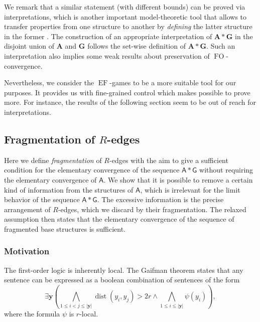 \documentclass[11pt]{article}
\theoremstyle{plain}
\theoremstyle{definition}
\theoremstyle{remark}
\newcommand{\bigland}{\bigwedge}
\DeclareMathOperator\dist{dist}
\DeclareMathOperator\FO{FO}
\DeclareMathOperator{\EF}{EF}
\newcommand{\str}[1]{\mathbf{#1}}
\newcommand{\strseq}[1]{{\boldsymbol{\mathsf{#1}}}}
\newcommand{\tpl}[1]{{\bm{#1}}}
\begin{document}
We remark that a similar statement (with different bounds) can be proved via interpretations, which is another important model-theoretic tool that allows to transfer properties from one structure to another by \emph{defining} the latter structure in the former \cite{hodges}\cite{unified_approach}.
The construction of an appropriate interpretation of $\str{A} * \str{G}$ in the disjoint union of $\str{A}$ and $\str{G}$ follows the set-wise definition of $\str{A} * \str{G}$.
Such an interpretation also implies some weak results about preservation of $\FO$-convergence.

Nevertheless, we consider the $\EF$-games to be a more suitable tool for our purposes.
It provides us with fine-grained control which makes possible to prove more.
For instance, the results of the following section seem to be out of reach for interpretations.

\subsection[Fragmentation of R-edges]{Fragmentation of $R$-edges}\label{ssec:fragmentation}

Here we define \emph{fragmentation} of $R$-edges with the aim to give a sufficient condition for the elementary convergence of the sequence $\strseq{A} * \strseq{G}$ without requiring the elementary convergence of $\strseq{A}$.
We show that it is possible to remove a certain kind of information from the structures of $\strseq{A}$, which is irrelevant for the limit behavior of the sequence $\strseq{A} * \strseq{G}$.
The excessive information is the precise arrangement of $R$-edges, which we discard by their fragmentation.
The relaxed assumption then states that the elementary convergence of the sequence of fragmented base structures is sufficient.

\subsubsection{Motivation}\label{sssec:motivation_for_fragmentation}

The first-order logic is inherently local.
The Gaifman theorem states that any sentence can be expressed as a boolean combination of sentences of the form
\begin{equation}\label{eq:gaifman_sentence}
    \exists \tpl{y} 
    \left(
        \bigland_{1 \leq i < j \leq |\tpl{y}|} \dist(y_i, y_j) > 2r
        \land
        \bigland_{1 \leq i \leq |\tpl{y}|} \psi(y_i)
    \right)
    ,
\end{equation}
where the formula $\psi$ is $r$-local.
\end{document}
